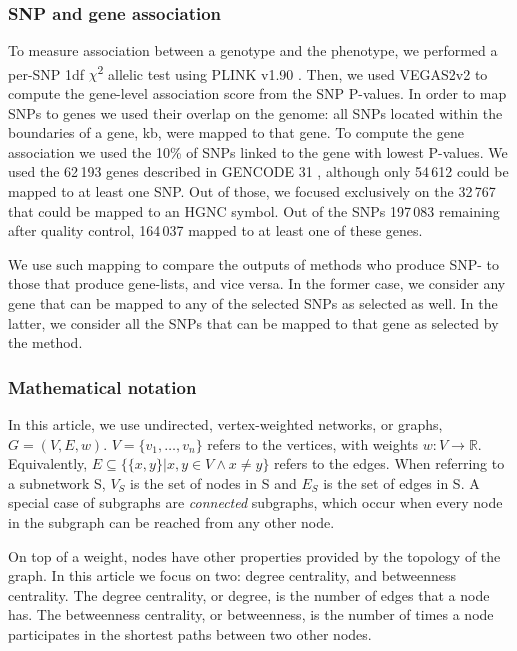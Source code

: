 \documentclass[twocolumn, 10pt]{article}
\begin{document}
\subsubsection{SNP and gene association}
\label{methods:node_score}
To measure association between a genotype and the phenotype, we performed a per-SNP 1df \(\chi\)\textsuperscript{2} allelic test using PLINK v1.90 \cite{chang_second-generation_2015}. Then, we used VEGAS2v2 to compute the gene-level association score \cite{mishra_vegas2:_2015} from the SNP P-values. In order to map SNPs to genes we used their overlap on the genome: all SNPs located within the boundaries of a gene,  kb, were mapped to that gene. To compute the gene association we used the 10\% of SNPs linked to the gene with lowest P-values. We used the 62\,193 genes described in GENCODE 31 \cite{frankish_gencode_2019}, although only 54\,612 could be mapped to at least one SNP. Out of those, we focused exclusively on the 32\,767 that could be mapped to an HGNC symbol. Out of the SNPs 197\,083 remaining after quality control, 164\,037 mapped to at least one of these genes. 

We use such mapping to compare the outputs of methods who produce SNP- to those that produce gene-lists, and vice versa. In the former case, we consider any gene that can be mapped to any of the selected SNPs as selected as well. In the latter, we consider all the SNPs that can be mapped to that gene as selected by the method.

\subsubsection{Mathematical notation}
\label{methods:notation}
In this article, we use undirected, vertex-weighted networks, or graphs, $G = (V,E,w)$. $V = \{v_{1}, \dots{}, v_{n}\}$ refers to the vertices, with weights $w: V \rightarrow \mathbb{R}$. Equivalently, $E \subseteq \{\{x,y\} | x,y \in V \wedge x \neq y\}$ refers to the edges. When referring to a subnetwork S, $V_{S}$ is the set of nodes in S and $E_{S}$ is the set of edges in S. A special case of subgraphs are \emph{connected} subgraphs, which occur when every node in the subgraph can be reached from any other node.

On top of a weight, nodes have other properties provided by the topology of the graph. In this article we focus on two: degree centrality, and betweenness centrality. The degree centrality, or degree, is the number of edges that a node has. The betweenness centrality, or betweenness, is the number of times a node participates in the shortest paths between two other nodes.
\end{document}
